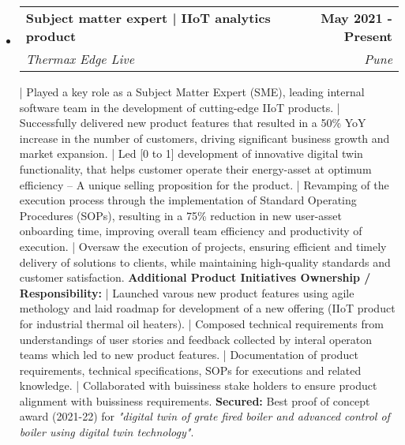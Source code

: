 \documentclass[a4paper, 10.9999pt]{article}
\makeatletter
\newlength{\outerbordwidth}
\newcommand{\resheading}[1]{\vspace{8pt}
  \parbox{\textwidth}{\setlength{\FrameSep}{\outerbordwidth}
    \begin{shaded}
\setlength{\fboxsep}{0pt}\framebox[\textwidth][l]{\setlength{\fboxsep}{4pt}\fcolorbox{shadecolorB}{shadecolorB}{\textbf{\sffamily{\mbox{~}\makebox[6.762in][l]{\large #1} \vphantom{p\^{E}}}}}}
    \end{shaded}
  }\vspace{-5pt}
}
\newcommand{\ressubheading}[4]{
\begin{tabular*}{19cm}{l@{\cftdotfill{\cftsecdotsep}\extracolsep{\fill}}r}
		\textbf{#1} & \textbf{#2} \\
		\textit{#3} & \textit{#4} \\
\end{tabular*}\vspace{-6pt}}
\makeatother
\begin{document}
\resheading{Experience}
\begin{itemize}
\item 
    \ressubheading{Subject matter expert | IIoT analytics product}{May 2021 - Present}{Thermax Edge Live}{Pune}
	\newline
	\newline | Played a key role as a Subject Matter Expert (SME), leading internal software team in the development of cutting-edge IIoT products.
	\newline | Successfully delivered new product features that resulted in a 50\% YoY increase in the number of customers, driving significant business growth and market expansion.
	\newline | Led [0 to 1] development of innovative digital twin functionality, that helps customer operate their energy-asset at optimum efficiency -- A unique selling proposition for the product. 
	\newline | Revamping of the execution process through the implementation of Standard Operating Procedures (SOPs), resulting in a 75\% reduction in new user-asset onboarding time, improving overall team efficiency and productivity of execution.
	\newline | Oversaw the execution of projects, ensuring efficient and timely delivery of solutions to clients, while maintaining high-quality standards and customer satisfaction.
	\vspace{0.25cm}
	\newline \textbf{Additional Product Initiatives Ownership / Responsibility:}
	\newline | Launched varous new product features using agile methology and laid roadmap for development of a new offering (IIoT product for industrial thermal oil heaters).
	\newline | Composed technical requirements from understandings of user stories and feedback collected by interal operaton teams which led to new product features.  
	\newline | Documentation of product requirements, technical specifications, SOPs for executions and related knowledge.
	\newline | Collaborated with buissiness stake holders to ensure product alignment with buissiness requirements.
	\vspace{0.25cm}
	\newline \textbf{Secured:} Best proof of concept award (2021-22) for \textit{"digital twin of grate fired boiler and advanced control of boiler using digital twin technology"}.

\end{itemize}
\end{document}
